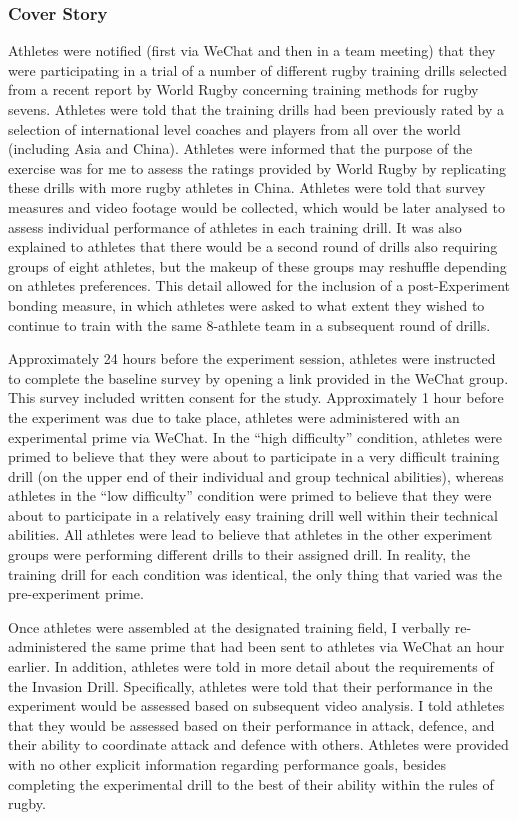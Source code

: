 \subsubsection{Cover Story}
Athletes were notified (first via WeChat and then in a team meeting) that they were participating in a trial of a number of different rugby training drills selected from a recent report by World Rugby concerning training methods for rugby sevens.  Athletes were told that the training drills had been previously rated by a selection of international level coaches and players from all over the world (including Asia and China).  Athletes were informed that the purpose of the exercise was for me to assess the ratings provided by World Rugby by replicating these drills with more rugby athletes in China.  Athletes were told that survey measures and video footage would be collected, which would be later analysed to assess individual performance of athletes in each training drill.  It was also explained to athletes that there would be a second round of drills also requiring groups of eight athletes, but the makeup of these groups may reshuffle depending on athletes preferences.  This detail allowed for the inclusion of a post-Experiment bonding measure, in which athletes were asked to what extent they wished to continue to train with the same 8-athlete team in a subsequent round of drills.

Approximately 24 hours before the experiment session, athletes were instructed to complete the baseline survey by opening a link provided in the WeChat group.  This survey included written consent for the study. Approximately 1 hour before the experiment was due to take place, athletes were administered with an experimental prime via WeChat.  In the ``high difficulty'' condition, athletes were primed to believe that they were about to participate in a very difficult training drill (on the upper end of their individual and group technical abilities), whereas athletes in the ``low difficulty'' condition were primed to believe that they were about to participate in a relatively easy training drill well within their technical abilities.  All athletes were lead to believe that athletes in the other experiment groups were performing different drills to their assigned drill. In reality, the training drill for each condition was identical, the only thing that varied was the pre-experiment prime.

Once athletes were assembled at the designated training field, I verbally re-administered the same prime that had been sent to athletes via WeChat an hour earlier.  In addition, athletes were told in more detail about the requirements of the Invasion Drill.  Specifically, athletes were told that their performance in the experiment would be assessed based on subsequent video analysis.  I told athletes that they would be assessed based on their performance in attack, defence, and their ability to coordinate attack and defence with others.  Athletes were provided with no other explicit information regarding performance goals, besides completing the experimental drill to the best of their ability within the rules of rugby.

